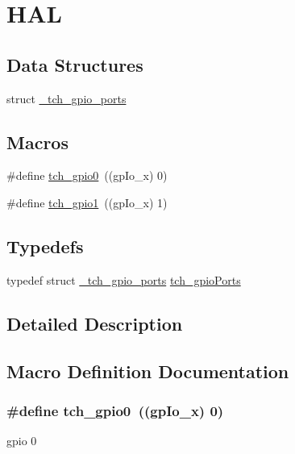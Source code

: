 \hypertarget{group___h_a_l}{\section{H\+A\+L}
\label{group___h_a_l}
}
\subsection*{Data Structures}
\begin{DoxyCompactItemize}
\item 
struct \hyperlink{struct__tch__gpio__ports}{\+\_\+tch\+\_\+gpio\+\_\+ports}
\end{DoxyCompactItemize}
\subsection*{Macros}
\begin{DoxyCompactItemize}
\item 
\#define \hyperlink{group___h_a_l_gab2092a7c3f1314638f712e5aad258bc0}{tch\+\_\+gpio0}~((gp\+Io\+\_\+x) 0)
\item 
\#define \hyperlink{group___h_a_l_gaec7a9f2671c2310088b6b3be57837938}{tch\+\_\+gpio1}~((gp\+Io\+\_\+x) 1)
\end{DoxyCompactItemize}
\subsection*{Typedefs}
\begin{DoxyCompactItemize}
\item 
typedef struct \hyperlink{struct__tch__gpio__ports}{\+\_\+tch\+\_\+gpio\+\_\+ports} \hyperlink{group___h_a_l_gad6418022c4ec33bbb97825b9136d3e03}{tch\+\_\+gpio\+Ports}
\end{DoxyCompactItemize}


\subsection{Detailed Description}


\subsection{Macro Definition Documentation}
\hypertarget{group___h_a_l_gab2092a7c3f1314638f712e5aad258bc0}{
\subsubsection[{tch\+\_\+gpio0}]{\setlength{\rightskip}{0pt plus 5cm}\#define tch\+\_\+gpio0~((gp\+Io\+\_\+x) 0)}}\label{group___h_a_l_gab2092a7c3f1314638f712e5aad258bc0}
gpio 0 

